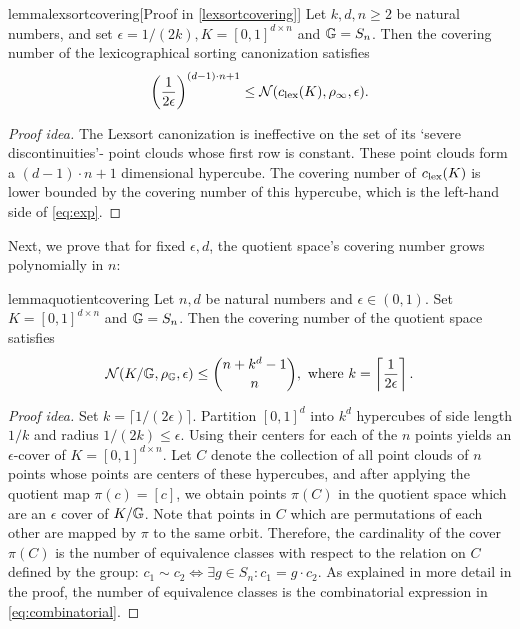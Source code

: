 \documentclass{article}
\begin{document}
\begin{restatable}{lemma}{lexsortcovering}[Proof in \ref{lexsortcovering}]
\label{lem:lexsortcovering}
Let $k,d,n\geq 2$ be natural numbers, and set $\epsilon=1/(2k), K=[0,1]^{d\times n}$ and $\mathbb{G}=S_n$. Then the covering number of the lexicographical sorting canonization satisfies 
\begin{equation}
\label{eq:exp}
\left( \frac{1}{2\epsilon}\right)^{(d-1)\cdot n + 1}\leq \mathcal{N}(c_{\mathrm{lex}}(K),\rho_\infty,\epsilon).
\end{equation}
\end{restatable}
\begin{proof}[Proof idea]
The Lexsort canonization is ineffective on the set of its `severe discontinuities'- point clouds whose first row is constant. These point clouds form a $(d-1)\cdot n+1 $ dimensional hypercube. The covering number of $c_{\mathrm{lex}}(K)$ is lower bounded by the covering number of this hypercube, which is the left-hand side of \eqref{eq:exp}.
\end{proof}
Next, we prove that for fixed $\epsilon,d$,  the quotient space's covering number grows polynomially in $n$:
\begin{restatable}{lemma}{quotientcovering}
\label{lem:quotient_covering}
Let $n,d$ be natural numbers and $\epsilon\in (0,1)$. Set $K=[0,1]^{d\times n}$ and $\mathbb{G}=S_n$. Then the covering number of the quotient space satisfies
\begin{equation}
\label{eq:combinatorial}
\mathcal{N}(K/\mathbb{G},\rho_{\mathbb{G}},\epsilon)
\leq
\binom{n+k^{d}-1}{n},
\text{ where }
k=\left\lceil \frac{1}{2\epsilon} \right\rceil .
\end{equation}
\end{restatable}
\begin{proof}[Proof idea]
Set $k=\lceil 1/(2\epsilon) \rceil $. Partition $[0,1]^d$ into $k^d$ hypercubes of side length $1/k$ and radius $1/(2k)\leq \epsilon$. Using their centers for each of the $n$ points yields an $\epsilon$-cover of $K=[0,1]^{d\times n}$. Let $C$ denote the collection of all point clouds of $n$ points whose points are centers of these hypercubes, and after applying the quotient map $\pi(c) = [c]$, we obtain points $\pi(C)$ in the quotient space which are an $\epsilon$ cover of $K/\mathbb{G}$. Note that points in $C$ which are permutations of each other are mapped by $\pi$ to the same orbit. Therefore, the cardinality of the cover $\pi(C)$ is the number of equivalence classes with respect to the relation on $C$ defined by the group: $c_1 \sim c_2 \iff \exists g \in S_n : c_1 = g\cdot c_2$. As explained in more detail in the proof, the number of equivalence classes is the combinatorial expression in \eqref{eq:combinatorial}.
\end{proof}
\end{document}
